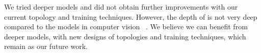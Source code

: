 \documentclass[11pt,letterpaper]{article}
\begin{document}
We tried deeper models and did not obtain further improvements with our current topology and training techniques. However, the depth of 
is not very deep compared to the models in computer vision ~\cite{He-Sun-ARXIV2015}. We believe we can benefit from deeper models, with new
designs of topologies and training techniques, which remain as our future work.





\end{document}
